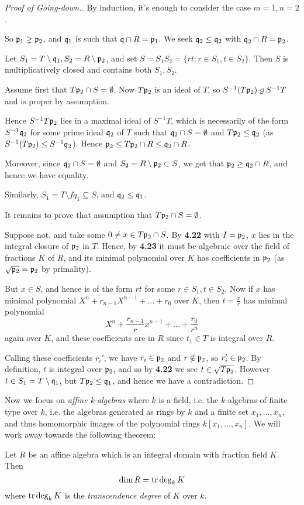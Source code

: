 \documentclass[10pt,a4paper]{article}
\begin{document}
\begin{proof}[Proof of Going-down.]
  By induction, it's enough to consider the case $m=1, n=2$.

  So $\mathfrak{p}_1\gneq \mathfrak{p}_2$, and $\mathfrak{q}_1$ is such that $\mathfrak{q}\cap R =\mathfrak{p}_1$. We seek $\mathfrak{q}_2 \leq \mathfrak{q}_2$ with $\mathfrak{q}_2 \cap R = \mathfrak{p}_2$.

  Let $S_1 = T\setminus \mathfrak{q}_1, S_2 = R\setminus \mathfrak{p}_2$, and set $S = S_1S_2 = \{rt : r \in S_1, t \in S_2\}$. Then $S$ is multiplicatively closed and contains both $S_1, S_2$.

  Assume first that $T\mathfrak{p}_2 \cap S = \emptyset$. Now $T \mathfrak{p}_2$ is an ideal of $T$, so $S^{-1}(T\p_2) \triangleleftneq S^{-1}T$ and is proper by assumption.

  Hence $S^{-1}T \mathfrak{p}_2$ lies in a maximal ideal of $S^{-1}T$, which is necessarily of the form $S^{-1}\mathfrak{q}_2$ for some prime ideal $\mathfrak{q}_2$ of $T$ such that $\mathfrak{q}_2 \cap S =\emptyset$ and $T\mathfrak{p}_2 \leq \mathfrak{q}_2$ (as $S^{-1}(T\mathfrak{p}_2) \leq S^{-1}\mathfrak{q}_2$). Hence $\mathfrak{p}_2 \leq T\mathfrak{p}_2 \cap R \leq \mathfrak{q}_2 \cap R$.

  Moreover, since $\mathfrak{q}_2 \cap S = \emptyset$ and $S_2 = R \setminus \mathfrak{p}_2 \subset S$, we get that $\mathfrak{p}_2 \geq \mathfrak{q}_2 \cap R$, and hence we have equality.

  Similarly, $S_1 = T\setminus f{q}_1 \subseteq S$, and $\mathfrak{q}_2 \leq \mathfrak{q}_1$.

  It remains to prove that assumption that $T\mathfrak{p}_2 \cap S = \emptyset$.

  Suppose not, and take some $0 \neq x \in T\mathfrak{p}_2 \cap S$. By \textbf{4.22} with $I = \mathfrak{p}_2$, $x$ lies in the integral closure of $\mathfrak{p}_2$ in $T$. Hence, by \textbf{4.23} it must be algebraic over the field of fractions $K$ of $R$, and its minimal polynomial over $K$ has coefficients in $\mathfrak{p}_2$ (as $\sqrt{\mathfrak{p}_2} = \mathfrak{p}_2$ by primality).

  But $x \in S$, and hence is of the form $rt$ for some $r \in S_1, t\in S_2$. Now if $x$ has minimal polynomial $X^n+r_{n-1}X^{n-1} + \ldots + r_0$ over $K$, then $t = \frac{x}{r}$ has minimal polynomial
  \[X^n + \frac{r_{n-1}}{r}x^{n-1} + \ldots + \frac{r_0}{r^n}\]
  again over $K$, and these coefficients are in $R$ since $t_1 \in T$ is integral over $R$.

  Calling these coefficients $r_i'$, we have $r_i \in \mathfrak{p}_2$ and $r\notin \mathfrak{p}_2$, so $r_i' \in \mathfrak{p}_2$. By definition, $t$ is integral over $\mathfrak{p}_2$, and so by \textbf{4.22} we see $t \in \sqrt{T\mathfrak{p}_2}$. However $t \in S_1 = T\setminus \mathfrak{q}_1$, but $T\mathfrak{p}_2 \leq \mathfrak{q}_1$, and hence we have a contradiction.
\end{proof}
Now we focus on \emph{affine k-algebras} where $k$ is a field, i.e. the $k$-algebras of finite type over $k$, i.e. the algebras generated as rings by $k$ and a finite set $x_1, \ldots, x_n$, and thus homomorphic images of the polynomial rings $k[x_1, \ldots, x_n]$. We will work away towards the following theorem:
\begin{theorem}
  Let $R$ be an affine algebra which is an integral domain with fraction field $K$. Then
  \[\dim R = \operatorname{tr} \deg_k K\]
  where $\operatorname{tr} \deg_k K$ is the \emph{transcendence degree} of $K$ over $k$.
\end{theorem}
\end{document}
